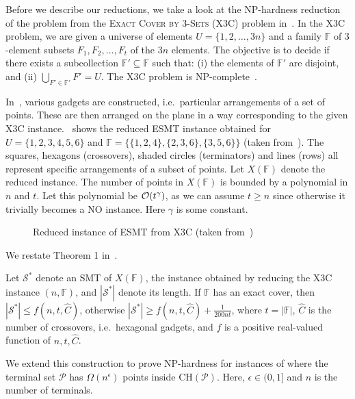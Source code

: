 Before we describe our reductions, we take a look at the NP-hardness reduction of the \ESMT problem from the \textsc{Exact Cover by 3-Sets} (X3C) problem in~\cite{garey1977complexity}. In the X3C problem, we are given a universe of elements $U = \{1, 2, \ldots, 3n\}$ and a family $\mathbb{F}$ of $3$-element subsets $F_1, F_2, \ldots, F_t$ of the $3n$ elements. The objective is to decide if there exists a subcollection $\mathbb{F}' \subseteq \mathbb{F}$ such that: (i) the elements of $\mathbb{F}'$ are disjoint, and (ii) $\bigcup_{F' \in \mathbb{F}'} F' = U$. The X3C problem is NP-complete~\cite{garey1979computers}.

In~\cite{garey1977complexity}, various gadgets are constructed, i.e.~particular arrangements of a set of points. These are then arranged on the plane in a way corresponding to the given X3C instance.~ shows the reduced ESMT instance obtained for $U = \{1,2,3,4,5,6\}$ and $\mathbb{F} = \{\{1, 2, 4\}, \{2, 3, 6\}, \{3, 5, 6\}\}$ (taken from~\cite{garey1977complexity}). The squares, hexagons (crossovers), shaded circles (terminators) and lines (rows) all represent specific arrangements of a subset of points. Let $X(\mathbb{F})$ denote the reduced instance. The number of points in $X(\mathbb{F})$ is bounded by a polynomial in $n$ and $t$. Let this polynomial be $\mathcal{O}(t^\gamma)$, as we can assume $t \geq n$ since otherwise it trivially becomes a NO instance. Here $\gamma$ is some constant.

\begin{figure}[h]
\centering
{}
\caption{Reduced instance of ESMT from X3C (taken from~\cite{garey1977complexity})}
\label{fig:redcn}
\end{figure}

We restate Theorem 1 in~\cite{garey1977complexity}.
\begin{proposition}\label{thm:redcn}
    Let $\mathcal{S}^{*}$ denote an SMT of $X(\mathbb{F})$, the instance obtained by reducing the X3C instance $(n,\mathbb{F})$, and $|\mathcal{S}^{*}|$ denote its length. If $\mathbb{F}$ has an exact cover, then $|\mathcal{S}^{*}| \leq f(n,t,\hat{C})$, otherwise $|\mathcal{S}^{*}| \geq f(n,t,\hat{C}) + \frac{1}{200nt}$, where $t = |\mathbb{F}|$, $\hat{C}$ is the number of crossovers, i.e.~hexagonal gadgets, and $f$ is a positive real-valued function of $n,t,\hat{C}$.
\end{proposition}

We extend this construction to prove NP-hardness for instances of \ESMT where the terminal set $\mathcal{P}$ has $\Omega(n^\epsilon)$ points inside $\mathrm{CH}(\mathcal{P})$. Here, $\epsilon \in (0,1]$ and $n$ is the number of terminals.

